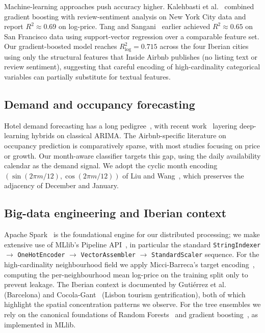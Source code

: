 \documentclass[conference]{IEEEtran}
\begin{document}
Machine-learning approaches push accuracy higher. Kalehbasti et al.~\cite{kalehbasti2019airbnb} combined gradient boosting with review-sentiment analysis on New York City data and report $R^2 \approx 0.69$ on log-price. Tang and Sangani~\cite{tang2015neighborhood} earlier achieved $R^2 \approx 0.65$ on San Francisco data using support-vector regression over a comparable feature set. Our gradient-boosted model reaches $R^2_{\log} = 0.715$ across the four Iberian cities using only the structural features that Inside Airbnb publishes (no listing text or review sentiment), suggesting that careful encoding of high-cardinality categorical variables can partially substitute for textual features.

\subsection{Demand and occupancy forecasting}
Hotel demand forecasting has a long pedigree~\cite{yang2014predicting,pan2012forecasting}, with recent work~\cite{cai2019hotel} layering deep-learning hybrids on classical ARIMA. The Airbnb-specific literature on occupancy prediction is comparatively sparse, with most studies focusing on price or growth. Our month-aware classifier targets this gap, using the daily availability calendar as the demand signal. We adopt the cyclic month encoding $(\sin(2\pi m/12), \cos(2\pi m/12))$ of Liu and Wang~\cite{liu2018cyclic}, which preserves the adjacency of December and January.

\subsection{Big-data engineering and Iberian context}
Apache Spark~\cite{zaharia2016apache} is the foundational engine for our distributed processing; we make extensive use of MLlib's Pipeline API~\cite{meng2016mllib}, in particular the standard \texttt{StringIndexer} $\to$ \texttt{OneHot\-Encoder} $\to$ \texttt{Vector\-Assembler} $\to$ \texttt{Standard\-Scaler} sequence. For the high-cardinality neighbourhood field we apply Micci-Barreca's target encoding~\cite{miccibarreca2001preprocessing}, computing the per-neighbourhood mean log-price on the training split only to prevent leakage. The Iberian context is documented by Guti{\'e}rrez et al.~\cite{gutierrez2017eruption} (Barcelona) and Cocola-Gant~\cite{cocolagant2018tourism} (Lisbon tourism gentrification), both of which highlight the spatial concentration patterns we observe. For the tree ensembles we rely on the canonical foundations of Random Forests~\cite{breiman2001random} and gradient boosting~\cite{friedman2001greedy}, as implemented in MLlib.
\end{document}
